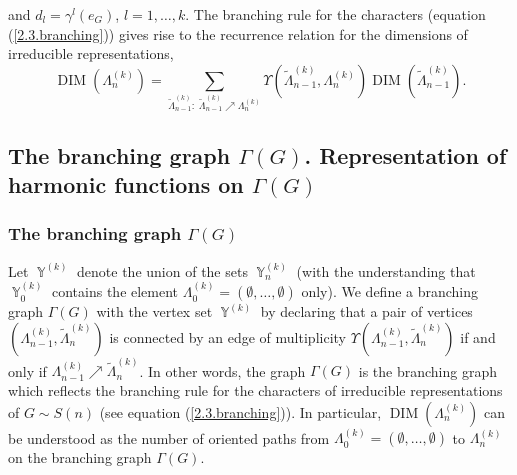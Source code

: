 \documentclass[12pt]{amsart}
\theoremstyle{definition}
\numberwithin{equation}{section}
\DeclareMathOperator{\Y}{\mathbb{Y}}
\DeclareMathOperator{\DIM}{DIM}
\newcommand{\tLambda}{\widetilde{\Lambda}}
\begin{document}
and $d_l=\gamma^l\left(e_{G}\right)$, $l=1,\ldots,k$.
The branching rule for the characters (equation (\ref{2.3.branching})) gives rise to the recurrence
relation for the dimensions of irreducible representations,
\begin{equation}
\DIM\left(\Lambda_n^{(k)}\right)
=\sum\limits_{\tLambda_{n-1}^{(k)}:\;\tLambda_{n-1}^{(k)}\nearrow\Lambda_n^{(k)}}\Upsilon\left(\tLambda_{n-1}^{(k)},\Lambda_n^{(k)}\right)\DIM\left(\tLambda_{n-1}^{(k)}\right).
\end{equation}
\subsection{The branching graph $\Gamma(G)$. Representation of harmonic functions on $\Gamma\left(G\right)$}
\subsubsection{The branching graph $\Gamma(G)$}
Let $\Y^{(k)}$ denote the union of the sets $\Y_n^{(k)}$
(with the understanding that $\Y_0^{(k)}$ contains the element
$\Lambda_0^{(k)}=\left(\emptyset,\ldots,\emptyset\right)$ only).
We define a branching graph $\Gamma\left(G\right)$ with the vertex set $\Y^{(k)}$  by declaring that a pair of vertices $\left(\Lambda_{n-1}^{(k)},\tLambda_n^{(k)}\right)$ is connected by an edge of multiplicity $\Upsilon\left(\Lambda_{n-1}^{(k)},\tLambda_n^{(k)}\right)$ if and only if $\Lambda_{n-1}^{(k)}\nearrow\tLambda_n^{(k)}$.
In other words, the graph $\Gamma\left(G\right)$ is the branching graph which reflects the branching rule for the characters of irreducible representations of $G\sim S(n)$ (see equation (\ref{2.3.branching})). In particular, $\DIM\left(\Lambda_n^{(k)}\right)$ can be understood as the number of oriented paths from $\Lambda_0^{(k)}=\left(\emptyset,\ldots,\emptyset\right)$ to $\Lambda_n^{(k)}$ on the branching graph $\Gamma(G)$.
\end{document}
